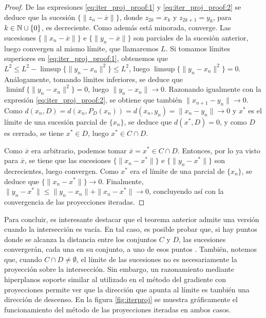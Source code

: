 \documentclass{book}
\begin{document}
\begin{proof}
	De las expresiones \ref{eq:iter_proj_proof:1} y \ref{eq:iter_proj_proof:2} se deduce que la sucesión $\{\|z_n - \overline{x}\|\}$, donde $z_{2k} = x_k$ y $z_{2k+1} = y_k$, para $k \in \mathbb{N} \cup\{0\}$, es decreciente. Como además está minorada, converge. Las sucesiones $\{\|x_n - \overline{x}\|\}$ e $\{\|y_n - \overline{x}\|\}$ son parciales de la sucesión anterior, luego convergen al mismo límite, que llamaremos $L$. Si tomamos límites superiores en \ref{eq:iter_proj_proof:1}, obtenemos que $L^2 \le L^2 - \limsup\{\|y_n - x_n\|^2\} \le L^2$, luego $\limsup\{\|y_n - x_n\|^2\} = 0$. Análogamente, tomando límites inferiores, se deduce que $\liminf\{\|y_n - x_n\|^2\} = 0$, luego $\|y_n - x_n \| \to 0$. Razonando igualmente con la expresión \ref{eq:iter_proj_proof:2}, se obtiene que también $\|x_{n+1} - y_n\| \to 0$. Como $d(x_n,D) = d(x_n,P_D(x_n)) = d(x_n,y_n) = \|x_n - y_n \| \to 0$ y $x^*$ es el límite de una sucesión parcial de $\{x_n\}$, se deduce que $d(x^*,D) = 0$, y como $D$ es cerrado, se tiene $x^* \in D$, luego $x^* \in C\cap D$.

	Como $\overline{x}$ era arbitrario, podemos tomar $\overline{x} = x^* \in C\cap D$. Entonces, por lo ya visto para $\overline{x}$, se tiene que las sucesiones $\{\|x_n - x^*\|\}$ e $\{\|y_n - x^*\|\}$ son decrecientes, luego convergen. Como $x^*$ era el límite de una parcial de $\{x_n\}$, se deduce que $\{\|x_n - x^*\|\} \to 0$. Finalmente, $\|y_n - x^*\| \le \|y_n - x_n\| + \|x_n - x^*\| \to 0$, concluyendo así con la convergencia de las proyecciones iteradas.

\end{proof}

Para concluir, es interesante destacar que el teorema anterior admite una versión cuando la intersección es vacía. En tal caso, es posible probar que, si hay puntos donde se alcanza la distancia entre los conjuntos $C$ y $D$, las sucesiones convergerán, cada una en su conjunto, a uno de esos puntos \cite{proximity_convex}. También, notemos que, cuando $C \cap D \ne \emptyset$, el límite de las sucesiones no es necesariamente la proyección sobre la intersección. Sin embargo, un razonamiento mediante hiperplanos soporte similar al utilizado en el método del gradiente con proyecciones permite ver que la dirección que apunta al límite es también una dirección de descenso. En la figura \ref{fig:iterproj} se muestra gráficamente el funcionamiento del método de las proyecciones iteradas en ambos casos.
\end{document}
